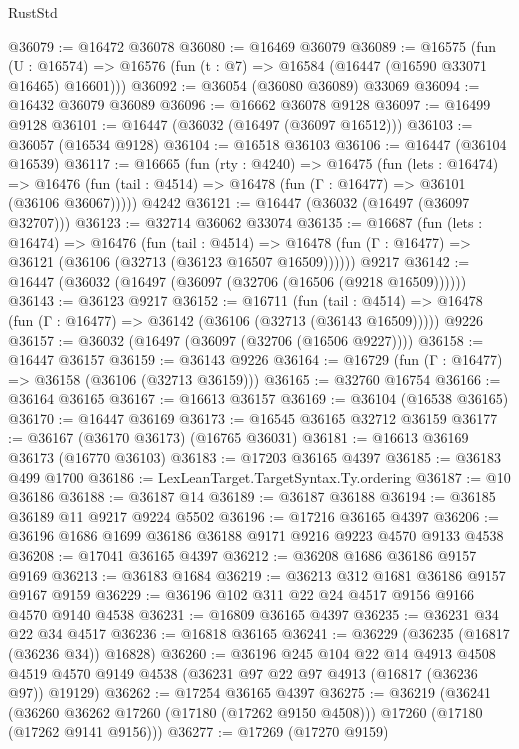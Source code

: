 \begin{lexlean}{RustStd}
\begin{coremodule}
{\begin{coremodule}
{{{{{{{{{{{{{{{{{{{{{{{{{{{{{{{{{{{{{{{{{{{{{{{{{{{{{{{@36079 := @16472 @36078
@36080 := @16469 @36079
@36089 := @16575
    (fun (U : @16574) => @16576 (fun (t : @7) => @16584 (@16447 (@16590 @33071 @16465) @16601)))
@36092 := @36054 (@36080 @36089) @33069
@36094 := @16432 @36079 @36089
@36096 := @16662 @36078 @9128
@36097 := @16499 @9128
@36101 := @16447 (@36032 (@16497 (@36097 @16512)))
@36103 := @36057 (@16534 @9128)
@36104 := @16518 @36103
@36106 := @16447 (@36104 @16539)
@36117 := @16665
    (fun (rty : @4240) =>
    @16475
      (fun (lets : @16474) =>
      @16476 (fun (tail : @4514) => @16478 (fun (Γ : @16477) => @36101 (@36106 @36067)))))
    @4242
@36121 := @16447 (@36032 (@16497 (@36097 @32707)))
@36123 := @32714 @36062 @33074
@36135 := @16687
    (fun (lets : @16474) =>
    @16476
      (fun (tail : @4514) =>
      @16478 (fun (Γ : @16477) => @36121 (@36106 (@32713 (@36123 @16507 @16509))))))
    @9217
@36142 := @16447 (@36032 (@16497 (@36097 (@32706 (@16506 (@9218 @16509))))))
@36143 := @36123 @9217
@36152 := @16711
    (fun (tail : @4514) => @16478 (fun (Γ : @16477) => @36142 (@36106 (@32713 (@36143 @16509)))))
    @9226
@36157 := @36032 (@16497 (@36097 (@32706 (@16506 @9227))))
@36158 := @16447 @36157
@36159 := @36143 @9226
@36164 := @16729 (fun (Γ : @16477) => @36158 (@36106 (@32713 @36159)))
@36165 := @32760 @16754
@36166 := @36164 @36165
@36167 := @16613 @36157
@36169 := @36104 (@16538 @36165)
@36170 := @16447 @36169
@36173 := @16545 @36165 @32712 @36159
@36177 := @36167 (@36170 @36173) (@16765 @36031)
@36181 := @16613 @36169 @36173 (@16770 @36103)
@36183 := @17203 @36165 @4397
@36185 := @36183 @499 @1700
@36186 := LexLeanTarget.TargetSyntax.Ty.ordering
@36187 := @10 @36186
@36188 := @36187 @14
@36189 := @36187 @36188
@36194 := @36185 @36189 @11 @9217 @9224 @5502
@36196 := @17216 @36165 @4397
@36206 := @36196 @1686 @1699 @36186 @36188 @9171 @9216 @9223 @4570 @9133 @4538
@36208 := @17041 @36165 @4397
@36212 := @36208 @1686 @36186 @9157 @9169
@36213 := @36183 @1684
@36219 := @36213 @312 @1681 @36186 @9157 @9167 @9159
@36229 := @36196 @102 @311 @22 @24 @4517 @9156 @9166 @4570 @9140 @4538
@36231 := @16809 @36165 @4397
@36235 := @36231 @34 @22 @34 @4517
@36236 := @16818 @36165
@36241 := @36229 (@36235 (@16817 (@36236 @34)) @16828)
@36260 := @36196
    @245
    @104
    @22
    @14
    @4913
    @4508
    @4519
    @4570
    @9149
    @4538
    (@36231 @97 @22 @97 @4913 (@16817 (@36236 @97)) @19129)
@36262 := @17254 @36165 @4397
@36275 := @36219
    (@36241
      (@36260 @36262 @17260 (@17180 (@17262 @9150 @4508)))
      @17260
      (@17180 (@17262 @9141 @9156)))
@36277 := @17269 (@17270 @9159)
}}}}}}}}}}}}}}}}}}}}}}}}}}}}}}}}}}}}}}}}}}}}}}}}}}}}}}}
\end{coremodule}}
\end{coremodule}
\end{lexlean}
